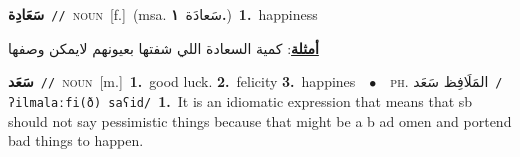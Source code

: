 \documentclass[10pt,a4paper,twoside]{article} %
\begin{document}
\begin{multicols}{2}
{\setlength\topsep{0pt}\textbf{\foreignlanguage{arabic}{سَعَادِة}}\ {\color{gray}\texttt{//}\color{black}}\ \textsc{noun}\ [f.]\ \color{gray}(msa. \foreignlanguage{arabic}{سَعادَة}~\foreignlanguage{arabic}{\textbf{١.}})\color{black}\ \textbf{1.}~happiness\  \begin{flushright}\color{gray}\foreignlanguage{arabic}{\textbf{\underline{\foreignlanguage{arabic}{أمثلة}}}: كمية السعادة اللي شفتها بعيونهم لايمكن وصفها}\end{flushright}\color{black}} \vspace{2mm}

{\setlength\topsep{0pt}\textbf{\foreignlanguage{arabic}{سَعَد}}\ {\color{gray}\texttt{//}\color{black}}\ \textsc{noun}\ [m.]\ \textbf{1.}~good luck.  \textbf{2.}~felicity  \textbf{3.}~happines\ \ $\bullet$\ \ \textsc{ph.} \color{gray} \foreignlanguage{arabic}{المَلَافِظ سَعَد}\color{black}\ {\color{gray}\texttt{/{\sffamily ʔilmalaːfi(ð) saʕid}/}\color{black}}\ \textbf{1.}~It is an idiomatic expression that means that sb should not say pessimistic things because that might be a b ad omen and portend bad things to happen.\ } \vspace{2mm}


\end{multicols}
\end{document}
